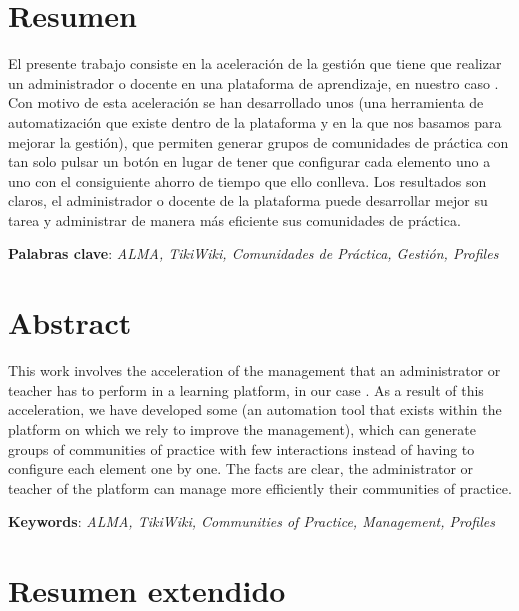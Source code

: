 \chapter{Resumen }

El presente trabajo consiste en la aceleración de la gestión que tiene que realizar un administrador o docente en una plataforma de aprendizaje, en nuestro caso \tiki{} \cite{web:tikiwiki}.
Con motivo de esta aceleración se han desarrollado unos \profiles{} \cite{web:explicacion-profiles} (una herramienta de automatización que existe dentro de la plataforma y en la que nos basamos para mejorar la gestión), que permiten generar grupos de comunidades de práctica con tan solo pulsar un botón en lugar de tener que configurar cada elemento uno a uno con el consiguiente ahorro de tiempo que ello conlleva. Los resultados son claros, el administrador o docente de la plataforma puede desarrollar mejor su tarea y administrar de manera más eficiente sus comunidades de práctica.

\textbf{Palabras clave}: \textit{ALMA, TikiWiki, Comunidades de Práctica, Gestión, Profiles}

\chapter{Abstract }

This work involves the acceleration of the management that an administrator or teacher has to perform in a learning platform, in our case \tiki{} \cite{web:tikiwiki}.
As a result of this acceleration, we have developed some \profiles{} \cite{web:explicacion-profiles} (an automation tool that exists within the platform on which we rely to improve the management), which can generate groups of communities of practice with few interactions instead of having to configure each element one by one. The facts are clear, the administrator or teacher of the platform can manage more efficiently their communities of practice.

\textbf{Keywords}: \textit{ALMA, TikiWiki, Communities of Practice, Management, Profiles}

\chapter{Resumen extendido}

